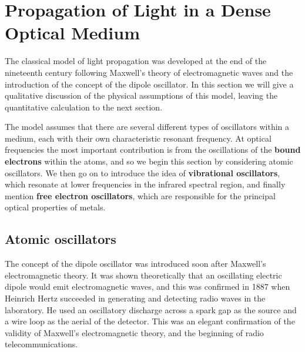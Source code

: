 \documentclass[12pt]{book}
\begin{document}
\section{Propagation of Light in a Dense Optical Medium}

The classical model of light propagation was developed at the end of the nineteenth century following Maxwell's theory of electromagnetic waves and the introduction of the concept of the dipole oscillator. In this section we will give a qualitative discussion of the physical assumptions of this model, leaving the quantitative calculation to the next section.

The model assumes that there are several different types of oscillators within a medium, each with their own characteristic resonant frequency. At optical frequencies the most important contribution is from the oscillations of the \textbf{bound electrons} within the atoms, and so we begin this section by considering atomic oscillators. We then go on to introduce the idea of \textbf{vibrational oscillators}, which resonate at lower frequencies in the infrared spectral region, and finally mention \textbf{free electron oscillators}, which are responsible for the principal optical properties of metals.

\subsection{Atomic oscillators}
The concept of the dipole oscillator was introduced soon after Maxwell's electromagnetic theory. It was shown theoretically that an oscillating electric dipole would emit electromagnetic waves, and this was confirmed in 1887 when Heinrich Hertz succeeded in generating and detecting radio waves in the laboratory. He used an oscillatory discharge across a spark gap as the source and a wire loop as the aerial of the detector. This was an elegant confirmation of the validity of Maxwell's electromagnetic theory, and the beginning of radio telecommunications.
\end{document}
